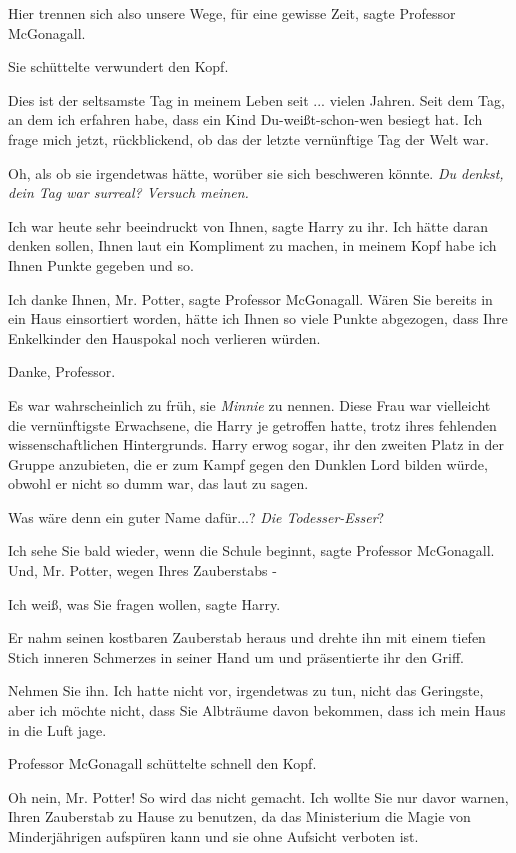 \glqq Hier trennen sich also unsere Wege, für eine gewisse Zeit\grqq{}, sagte
Professor McGonagall.

Sie schüttelte verwundert den Kopf.

\glqq Dies ist der seltsamste Tag in meinem Leben seit ... vielen Jahren. Seit
dem Tag, an dem ich erfahren habe, dass ein Kind Du-weißt-schon-wen besiegt hat.
Ich frage mich jetzt, rückblickend, ob das der letzte vernünftige Tag der Welt
war.\grqq{}

Oh, als ob sie irgendetwas hätte, worüber sie sich beschweren könnte. \emph{Du
denkst, dein Tag war surreal? Versuch meinen.}

\glqq Ich war heute sehr beeindruckt von Ihnen\grqq{}, sagte Harry zu ihr. \glqq
Ich hätte daran denken sollen, Ihnen laut ein Kompliment zu machen, in meinem
Kopf habe ich Ihnen Punkte gegeben und so.\grqq{}

\glqq Ich danke Ihnen, Mr. Potter\grqq{}, sagte Professor McGonagall. \glqq
Wären Sie bereits in ein Haus einsortiert worden, hätte ich Ihnen so viele
Punkte abgezogen, dass Ihre Enkelkinder den Hauspokal noch verlieren
würden.\grqq{}

\glqq Danke, Professor.\grqq{}

Es war wahrscheinlich zu früh, sie \emph{Minnie} zu nennen. Diese Frau war
vielleicht die vernünftigste Erwachsene, die Harry je getroffen hatte, trotz
ihres fehlenden wissenschaftlichen Hintergrunds. Harry erwog sogar, ihr den
zweiten Platz in der Gruppe anzubieten, die er zum Kampf gegen den Dunklen Lord
bilden würde, obwohl er nicht so dumm war, das laut zu sagen.

Was wäre denn ein guter Name dafür...? \emph{Die Todesser-Esser}?

\glqq Ich sehe Sie bald wieder, wenn die Schule beginnt\grqq{}, sagte Professor
McGonagall. \glqq Und, Mr. Potter, wegen Ihres Zauberstabs -\grqq{}

\glqq Ich weiß, was Sie fragen wollen\grqq{}, sagte Harry.

Er nahm seinen kostbaren Zauberstab heraus und drehte ihn mit einem tiefen Stich
inneren Schmerzes in seiner Hand um und präsentierte ihr den Griff.

\glqq Nehmen Sie ihn. Ich hatte nicht vor, irgendetwas zu tun, nicht das
Geringste, aber ich möchte nicht, dass Sie Albträume davon bekommen, dass ich
mein Haus in die Luft jage.\grqq{}

Professor McGonagall schüttelte schnell den Kopf.

\glqq Oh nein, Mr. Potter! So wird das nicht gemacht. Ich wollte Sie nur davor
warnen, Ihren Zauberstab zu Hause zu benutzen, da das Ministerium die Magie von
Minderjährigen aufspüren kann und sie ohne Aufsicht verboten ist.\grqq{}

